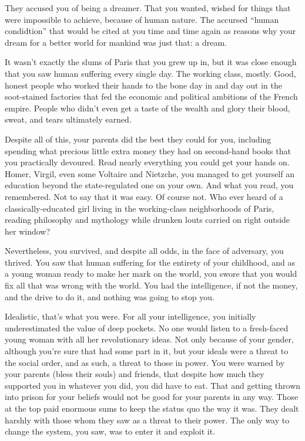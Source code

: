 \documentclass[char]{airship}
\begin{document}
\name{\cSaboteur{}}



They accused you of being a dreamer.  That you wanted, wished for
things that were impossible to achieve, because of human nature.  The
accursed ``human condidtion'' that would be cited at you time and time
again as reasons why your dream for a better world for mankind was
just that: a dream.

It wasn't exactly the slums of Paris that you grew up in, but it was
close enough that you saw human suffering every single day.  The
working class, mostly.  Good, honest people who worked their hands to
the bone day in and day out in the soot-stained factories that fed the
economic and political ambitions of the French empire.  People who
didn't even get a taste of the wealth and glory their blood, sweat,
and tears ultimately earned.

Despite all of this, your parents did the best they could for you,
including spending what precious little extra money they had on
second-hand books that you practically devoured.  Read nearly
everything you could get your hands on.  Homer, Virgil, even some
Voltaire and Nietzche, you managed to get yourself an education beyond
the state-regulated one on your own.  And what you read, you
remembered.  Not to say that it was easy.  Of course not.  Who ever
heard of a classically-educated girl living in the working-class
neighborhoods of Paris, reading philosophy and mythology while drunken
louts carried on right outside her window?

Nevertheless, you survived, and despite all odds, in the face of
adversary, you thrived.  You saw that human suffering for the entirety
of your childhood, and as a young woman ready to make her mark on the
world, you swore that you would fix all that was wrong with the world.
You had the intelligence, if not the money, and the drive to do it,
and nothing was going to stop you.

Idealistic, that's what you were.  For all your intelligence, you
initially underestimated the value of deep pockets.  No one would
listen to a fresh-faced young woman with all her revolutionary ideas.  Not only because of your gender, although you're sure that had some part in it, but your ideals were a threat to the social order, and as such, a threat to those in power.  You were warned by your parents (bless their souls) and friends, that despite how much they supported you in whatever you did, you did have to eat.  That and getting thrown into prison for your beliefs would not be good for your parents in any way. 
Those at the top paid enormous sums to keep the status quo the way it
was.  They dealt harshly with those whom they saw as a threat to their power.  The only way to change the system, you saw, was to enter it and exploit it.
\end{document}
